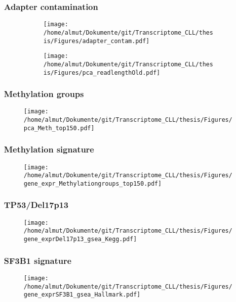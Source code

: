 \documentclass[xcolor=dvipsnames,t,10pt]{beamer}
\begin{document}
\begin{frame}[c]
	\frametitle{Adapter contamination}
	\begin{figure}
		\centering
		\begin{subfigure}[t]{0.48\columnwidth}
			\texttt{[image: /home/almut/Dokumente/git/Transcriptome\_CLL/thesis/Figures/adapter\_contam.pdf]}
		\end{subfigure}
		\hfill
		\begin{subfigure}[t]{0.43\columnwidth}
			\texttt{[image: /home/almut/Dokumente/git/Transcriptome\_CLL/thesis/Figures/pca\_readlengthOld.pdf]}
		\end{subfigure}
	\end{figure}
\end{frame}
%
%
\begin{frame}[c]
	\frametitle{Methylation groups}
	\begin{figure}
		\centering
		\texttt{[image: /home/almut/Dokumente/git/Transcriptome\_CLL/thesis/Figures/pca\_Meth\_top150.pdf]}
	\end{figure}
\end{frame}
%
%
\begin{frame}[c]
	\frametitle{Methylation signature}
	\begin{figure}
		\centering
		\texttt{[image: /home/almut/Dokumente/git/Transcriptome\_CLL/thesis/Figures/gene\_expr\_Methylationgroups\_top150.pdf]}
	\end{figure}
\end{frame}
%
%
\begin{frame}[c]
	\frametitle{TP53/Del17p13}
	\begin{figure}
		\centering
		\texttt{[image: /home/almut/Dokumente/git/Transcriptome\_CLL/thesis/Figures/gene\_exprDel17p13\_gsea\_Kegg.pdf]}
	\end{figure}
\end{frame}
%
%
\begin{frame}[c]
	\frametitle{SF3B1 signature}
	\begin{figure}
		\centering
		\texttt{[image: /home/almut/Dokumente/git/Transcriptome\_CLL/thesis/Figures/gene\_exprSF3B1\_gsea\_Hallmark.pdf]}
	\end{figure}
\end{frame}
\end{document}
